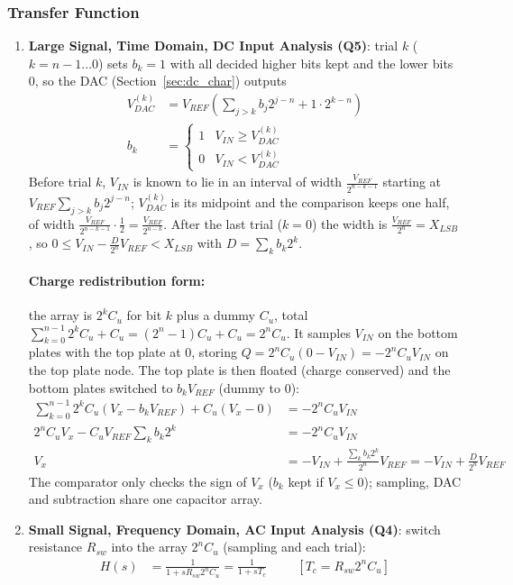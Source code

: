 \subsubsection{Transfer Function}
\begin{enumerate}
  \item \textbf{Large Signal, Time Domain, DC Input Analysis (Q5)}: trial \(k\)
(\(k = n - 1 \ldots 0\)) sets \(b_k = 1\) with all decided higher bits kept and
the lower bits 0, so the DAC (Section~\ref{sec:dc_char}) outputs
\begin{align*}
  V_{DAC}^{(k)} &= V_{REF}\left(\sum_{j > k} b_j 2^{j-n} + 1 \cdot 2^{k-n}\right) \\
  b_k &= \begin{cases} 1 & V_{IN} \geq V_{DAC}^{(k)} \\ 0 & V_{IN} < V_{DAC}^{(k)} \end{cases}
\end{align*}
Before trial \(k\), \(V_{IN}\) is known to lie in an interval of width
\(\frac{V_{REF}}{2^{n-k-1}}\) starting at \(V_{REF}\sum_{j > k} b_j 2^{j-n}\); \(V_{DAC}^{(k)}\) is its midpoint and the
comparison keeps one half, of width \(\frac{V_{REF}}{2^{n-k-1}}\cdot\frac{1}{2} = \frac{V_{REF}}{2^{n-k}}\). After the last
trial (\(k = 0\)) the width is \(\frac{V_{REF}}{2^n} = X_{LSB}\), so
\(0 \leq V_{IN} - \frac{D}{2^n} V_{REF} < X_{LSB}\) with \(D = \sum_k b_k 2^k\).

\paragraph{Charge redistribution form:} the array is \(2^k C_u\) for bit \(k\) plus
a dummy \(C_u\), total \(\sum_{k=0}^{n-1} 2^k C_u + C_u = (2^n - 1) C_u + C_u = 2^n C_u\). It samples \(V_{IN}\) on
the bottom plates with the top plate at 0, storing
\(Q = 2^n C_u (0 - V_{IN}) = -2^n C_u V_{IN}\) on the top plate node. The top plate is
then floated (charge conserved) and the bottom plates switched to
\(b_k V_{REF}\) (dummy to 0):
\begin{align*}
  \sum_{k=0}^{n-1} 2^k C_u (V_x - b_k V_{REF}) + C_u (V_x - 0) &= -2^n C_u V_{IN} \\
  2^n C_u V_x - C_u V_{REF} \sum_k b_k 2^k &= -2^n C_u V_{IN} \\
  V_x &= -V_{IN} + \frac{\sum_k b_k 2^k}{2^n} V_{REF} = -V_{IN} + \frac{D}{2^n} V_{REF} \tag{1}
\end{align*}
The comparator only checks the sign of \(V_x\) (\(b_k\) kept if \(V_x \leq 0\));
sampling, DAC and subtraction share one capacitor array.
  \item \textbf{Small Signal, Frequency Domain, AC Input Analysis (Q4)}: switch resistance \(R_{sw}\)
    into the array \(2^n C_u\) (sampling and each trial):
    \begin{align*}
      H(s) &= \frac{1}{1 + s R_{sw} 2^n C_u} = \frac{1}{1 + s T_c} \hspace{1cm} [T_c = R_{sw} 2^n C_u] \tag{2}
    \end{align*}
\end{enumerate}

